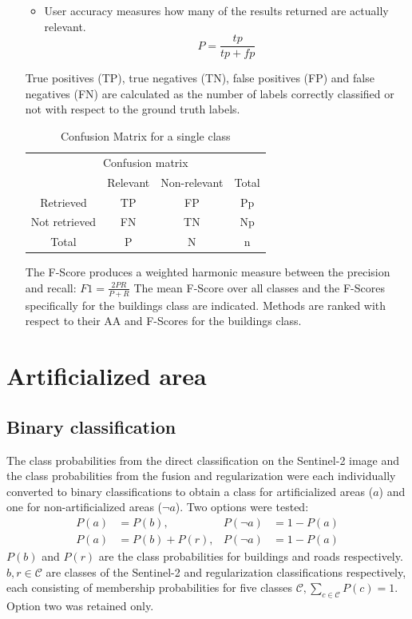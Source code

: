 \documentclass[10pt]{article}
\begin{document}
\begin{itemize}
\begin{itemize}
\begin{equation}
	    \end{equation}
	    \item User accuracy measures how many of the results returned are actually relevant.
	    \begin{equation}
	        P=\frac{tp}{tp+fp}
	    \end{equation}
    \end{itemize}
    True positives (TP), true negatives (TN), false positives (FP) and false negatives (FN) are calculated as the number of labels correctly classified or not with respect to the ground truth labels.
    \begin{table}[H]
        \begin{center}
            \begin{tabular}{c|c c| c}
                \multicolumn{4}{c}{Confusion matrix} \\
                 & Relevant & Non-relevant & Total \\
                \hline
                Retrieved & TP & FP & Pp \\
                Not retrieved & FN & TN & Np \\
                \hline
                Total & P & N & n
            \end{tabular}
            \caption{Confusion Matrix for a single class}
            \label{table:confusion_oneclass}
        \end{center}
    \end{table}
    The F-Score produces a weighted harmonic measure between the precision and recall:
	$F1=\frac{2PR}{P+R}$
    The mean F-Score over all classes and the F-Scores specifically for the buildings class are indicated. Methods are ranked with respect to their AA and F-Scores for the buildings class.
\end{itemize}
\section{Artificialized area}

\subsection{Binary classification}
The class probabilities from the direct classification on the Sentinel-2 image and the class probabilities from the fusion and regularization were each individually converted to binary classifications to obtain a class for artificialized areas ($a$) and one for non-artificialized areas ($\neg a$). Two options were tested:
\begin{align}
    P(a)&=P(b),  &P(\neg a)&= 1 - P(a)\label{eq:bin1}\\
    P(a)&=P(b)+P(r),  &P(\neg a)&= 1 - P(a)\label{eq:bin2}
\end{align}
$P(b)$ and $P(r)$ are the class probabilities for buildings and roads respectively. $b, r\in \mathcal{C}$ are classes of the Sentinel-2 and regularization classifications respectively, each consisting of membership probabilities for five classes $\mathcal{C}, \sum_{c \in \mathcal{C}}P(c) = 1$. Option two was retained only.\\ %
\end{document}
